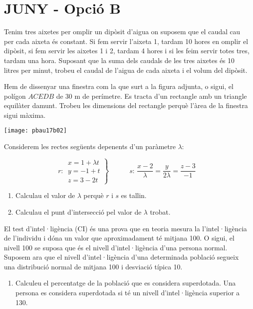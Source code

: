 \documentclass[11pt, a4paper, pdf]{book}
\begin{document}
\section*{JUNY - Opció B} 
\setcounter{myenumi}{0}
\begin{mylist}

\item Tenim tres aixetes per omplir un dipòsit d'aigua on suposem que el caudal cau per cada aixeta és constant. Si fem servir l'aixeta 1, tardam 10 hores en omplir el dipòsit, si fem servir les aixetes 1 i 2, tardam 4 hores i si les feim servir totes tres, tardam una hora.
Suposant que la suma dels caudals de les tres aixetes és 10 litres per minut, trobeu el caudal de l'aigua de cada aixeta i el volum del dipòsit.


\vspace{-2cm}
\item \begin{minipage}[t]{0.7\textwidth}
	Hem de dissenyar una finestra com la que surt a la figura adjunta, o sigui, el polígon $ACEDB$ de 30 m de perímetre. Es tracta d'un rectangle amb un triangle equilàter damunt. Trobeu les dimensions del rectangle perquè l'àrea de la finestra sigui màxima.
	
\end{minipage}
\begin{minipage}{0.3\textwidth}
	\centering
	\vspace{1.5cm}
	\texttt{[image: pbau17b02]}
\end{minipage}
 
\item Considerem les rectes següents depenents d'un paràmetre $\lambda$:

\[ r:  \, \left. \begin{array}{l} x=1+\lambda t \\ y=-1+t \\ z=3-2t \end{array} \right\}  \quad\quad\quad  
s: \, \frac{x-2}{\lambda}=\frac{y}{2\lambda}=\frac{z-3}{-1} \]

\begin{enumerate}
	\item Calculau el valor de $\lambda$ perquè $r$ i $s$ es tallin.
	\item Calculau el punt d'intersecció pel valor de $\lambda$ trobat.
\end{enumerate}	
	
	
\item  El test d'intel·ligència (CI) és	una prova que en teoria mesura la l'intel·ligència de l'individu i dóna un valor que aproximadament té mitjana 100. O sigui, el nivell 100 se suposa que és el nivell d'intel·ligència d'una persona normal. Suposem ara que el nivell d'intel·ligència d'una determinada població segueix una distribució normal de mitjana 100 i desviació típica 10.
\begin{enumerate}
	\item Calculeu el percentatge de la població que es considera superdotada. Una persona es considera superdotada si té un nivell d'intel·ligència superior a 130.
	

\end{enumerate}
\end{mylist}
\end{document}
